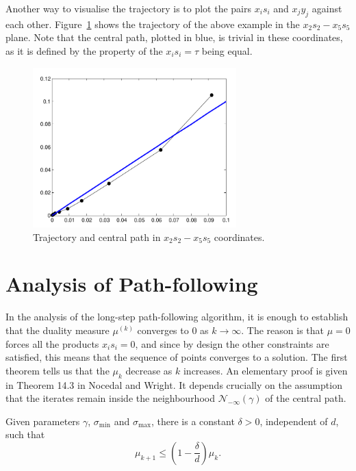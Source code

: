 Another way to visualise the trajectory is to plot the pairs $x_is_i$ and $x_jy_j$ against each other.
Figure~\ref{fig:fig2} shows the trajectory of the above example in the $x_2s_2-x_5s_5$ plane. Note that the  central path, plotted in blue, is trivial in these coordinates, as it is defined by the property of the $x_is_i=\tau$ being equal.
\begin{figure}[h!]
\centering
 \includegraphics[width=0.7\textwidth]{images/lect12b_cropped.pdf}
 \caption{Trajectory and central path in $x_2s_2-x_5s_5$ coordinates.}\label{fig:fig2}
\end{figure}

\section{Analysis of Path-following}
In the analysis of the long-step path-following algorithm, it is enough to establish that the duality measure $\mu^{(k)}$ converges to $0$ as $k\to \infty$. The reason is that $\mu=0$ forces all the products $x_is_i=0$, and since by design the other constraints are satisfied, this means that the sequence of points converges to a solution. The first theorem tells us that the $\mu_k$ decrease as $k$ increases. An elementary proof is given in Theorem 14.3 in Nocedal and Wright. It depends crucially on the assumption that the iterates remain inside the neighbourhood $\mathcal{N}_{-\infty}(\gamma)$ of the central path.

\begin{theorem}
 Given parameters $\gamma$, $\sigma_{\mathrm{min}}$ and $\sigma_{\mathrm{max}}$, there is a constant $\delta>0$, independent of $d$, such that
 \begin{equation}\label{thm:1}
  \mu_{k+1}\leq \left(1-\frac{\delta}{d}\right) \mu_k.
 \end{equation}
\end{theorem}

